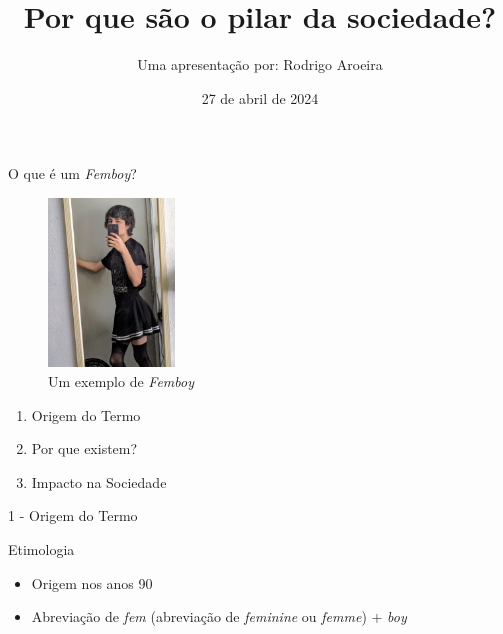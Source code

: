 \documentclass{beamer}
\title{Por que \femboys{} são o pilar da sociedade?}
\author{Uma apresentação por: \vscpace
Rodrigo Aroeira}
\date{27 de abril de 2024}
\newcommand{\femboy}{\textit{Femboy}}
\newcommand{\addNewlines}[1]{\vspace*{#1\baselineskip}}
\begin{document}
\maketitle


\begin{frame}{\begin{center}
    \Large{O que é um \femboy?}
\end{center}}

\begin{figure}
    \includegraphics[width=0.3\textwidth]{femboy.jpg}
    \caption{Um exemplo de \femboy}
\end{figure}

\end{frame}

\begin{frame}{}
   \begin{enumerate}
    \item Origem do Termo
    \item Por que existem?
    \item Impacto na Sociedade
   \end{enumerate} 
\end{frame}


\begin{frame}{1 - Origem do Termo}
\begin{center}
    \Huge{Etimologia}
    \addNewlines{3}
\end{center}

\begin{itemize}
    \item Origem nos anos 90
    \item Abreviação de \textit{fem} (abreviação de \textit{feminine} ou \textit{femme}) + \textit{boy}
\end{itemize}

\end{frame}

\end{document}
